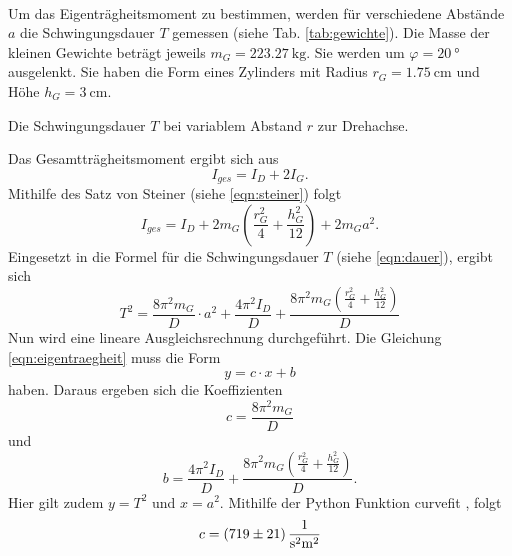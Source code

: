 \\
Um das Eigenträgheitsmoment zu bestimmen, werden für verschiedene Abstände $a$ die Schwingungsdauer $T$ gemessen (siehe Tab. \ref{tab:gewichte}).
Die Masse der kleinen Gewichte beträgt jeweils $m_G = \SI{223,27}{\kg}$.
Sie werden um $\varphi = \SI{20}{\degree}$ ausgelenkt.
Sie haben die Form eines Zylinders mit Radius $r_G=\SI{1,75}{\centi\metre}$ und Höhe $h_G=\SI{3}{\centi\metre}$.
\begin{table}
    \centering
    \caption{Die Schwingungsdauer $T$ bei variablem Abstand $r$ zur Drehachse.}
    \label{tab:gewichte}  
\end{table}
\FloatBarrier
Das Gesamtträgheitsmoment ergibt sich aus
\begin{equation*}
    I_{ges} = I_D + 2 I_G .
\end{equation*}
Mithilfe des Satz von Steiner (siehe \autoref{eqn:steiner}) folgt
\begin{equation*}
    I_{ges} = I_D + 2 m_G \left ( \frac{r^2_G}{4} + \frac{h^2_G}{12} \right) + 2 m_G a^2 .
\end{equation*}
Eingesetzt in die Formel für die Schwingungsdauer $T$ (siehe \autoref{eqn:dauer}), ergibt sich
\begin{equation}
    T^2 = \frac{8 \pi^2 m_G}{D} \cdot a^2 + \frac{4 \pi^2 I_D}{D} + \frac{8 \pi^2 m_G \left (\frac{r^2_G}{4} + \frac{h^2_G}{12} \right )}{D}
    \label{eqn:eigentraegheit}
\end{equation}
Nun wird eine lineare Ausgleichsrechnung durchgeführt.
Die Gleichung \ref{eqn:eigentraegheit} muss die Form
\begin{equation*}
    y = c \cdot x + b 
\end{equation*}
haben.
Daraus ergeben sich die Koeffizienten
\begin{equation*}
    c = \frac{8\pi^2m_G}{D}
\end{equation*}
und
\begin{equation}
    b = \frac{4 \pi^2 I_D}{D} + \frac{8 \pi^2 m_G \left (\frac{r^2_G}{4} + \frac{h^2_G}{12} \right )}{D}.
    \label{eqn:b}
\end{equation}
Hier gilt zudem $y = T^2$ und $x = a^2$.
Mithilfe der Python Funktion curvefit \cite{scipy}, folgt
\begin{equation*}
    c = \SI{719(21)}{\frac{1}{\second^2 \metre^2}}
\end{equation*}
